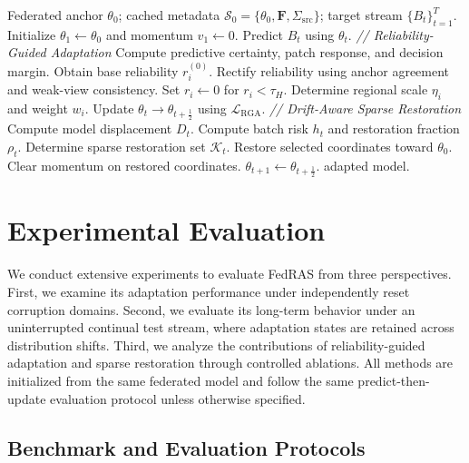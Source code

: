 \documentclass[journal]{IEEEtran}
\begin{document}
\begin{algorithm}[t]
\caption{FedRAS for Continual Test-Time Adaptation}
\label{alg:fedras}
\begin{algorithmic}[1]
\Require Federated anchor $\theta_0$; cached metadata $\mathcal{S}_0 = \{\theta_0, \mathbf{F}, \Sigma_{\mathrm{src}}\}$; target stream $\{B_t\}_{t=1}^T$.
\State Initialize $\theta_1 \gets \theta_0$ and momentum $v_1 \gets 0$.
    \State Predict $B_t$ using $\theta_t$.
    \Statex \quad \textit{// Reliability-Guided Adaptation}
    \State Compute predictive certainty, patch response, and decision margin.
    \State Obtain base reliability $r_i^{(0)}$.
    \State Rectify reliability using anchor agreement and weak-view consistency.
    \State Set $r_i \gets 0$ for $r_i < \tau_H$.
    \State Determine regional scale $\eta_i$ and weight $w_i$.
    \State Update $\theta_t \to \theta_{t+\frac{1}{2}}$ using $\mathcal{L}_{\mathrm{RGA}}$.
    \Statex \quad \textit{// Drift-Aware Sparse Restoration}
        \State Compute model displacement $D_t$.
        \State Compute batch risk $h_t$ and restoration fraction $\rho_t$.
        \State Determine sparse restoration set $\mathcal{K}_t$.
        \State Restore selected coordinates toward $\theta_0$.
        \State Clear momentum on restored coordinates.
    \Else
        \State $\theta_{t+1} \gets \theta_{t+\frac{1}{2}}$.
    \EndIf
\EndFor
\State \Return adapted model.
\end{algorithmic}
\end{algorithm}

\section{Experimental Evaluation}
\label{sec:experiments}

We conduct extensive experiments to evaluate FedRAS from three perspectives. First, we examine its adaptation performance under independently reset corruption domains. Second, we evaluate its long-term behavior under an uninterrupted continual test stream, where adaptation states are retained across distribution shifts. Third, we analyze the contributions of reliability-guided adaptation and sparse restoration through controlled ablations. All methods are initialized from the same federated model and follow the same predict-then-update evaluation protocol unless otherwise specified.

\subsection{Benchmark and Evaluation Protocols}
\end{document}
